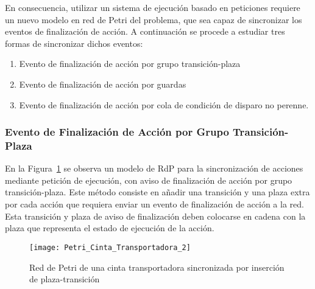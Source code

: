 En consecuencia, utilizar un sistema de ejecución basado en peticiones requiere
un nuevo modelo en red de Petri del problema, que sea capaz de sincronizar los
eventos de finalización de acción. A continuación se procede a estudiar tres
formas de sincronizar dichos eventos:
\begin{enumerate}
  \item Evento de finalización de acción por grupo transición-plaza
  \item Evento de finalización de acción por guardas
  \item Evento de finalización de acción por cola de condición de disparo no
  perenne.
\end{enumerate}

\subsubsection{Evento de Finalización de Acción por Grupo
Transición-Plaza}
\label{sec:sincronizacion_peticion_ejecucion_transicion_plaza}
En la Figura~\ref{fig:petri_cinta_transportadora_2} se observa un modelo de
RdP para la sincronización de acciones mediante petición de ejecución, con aviso
de finalización de acción por grupo transición-plaza. Este método consiste en
añadir una transición y una plaza extra por cada acción que
requiera enviar un evento de finalización de acción a la red. Esta transición y
plaza de aviso de finalización deben colocarse en cadena con la plaza que
representa el estado de ejecución de la acción.
\\

\begin{figure}[H]
    \centering
    \texttt{[image: Petri\_Cinta\_Transportadora\_2]}
    \caption{Red de Petri de una cinta transportadora sincronizada por inserción
    de plaza-transición}
    \label{fig:petri_cinta_transportadora_2}
\end{figure}


